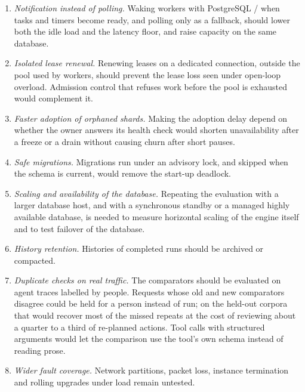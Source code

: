 \begin{enumerate}[leftmargin=*, itemsep=2pt]
  \item \emph{Notification instead of polling.} Waking workers with
    PostgreSQL / when tasks and timers become ready, and
    polling only as a fallback, should lower both the idle load and the
    latency floor, and raise capacity on the same database.
  \item \emph{Isolated lease renewal.} Renewing leases on a dedicated
    connection, outside the pool used by workers, should prevent the lease
    loss seen under open-loop overload. Admission control that refuses work
    before the pool is exhausted would complement it.
  \item \emph{Faster adoption of orphaned shards.} Making the adoption delay
    depend on whether the owner answers its health check would shorten
    unavailability after a freeze or a drain without causing churn after
    short pauses.
  \item \emph{Safe migrations.} Migrations run under an advisory lock, and
    skipped when the schema is current, would remove the start-up deadlock.
  \item \emph{Scaling and availability of the database.} Repeating the
    evaluation with a larger database host, and with a synchronous standby
    or a managed highly available database, is needed to measure horizontal
    scaling of the engine itself and to test failover of the database.
  \item \emph{History retention.} Histories of completed runs should be
    archived or compacted.
  \item \emph{Duplicate checks on real traffic.} The comparators should be
    evaluated on agent traces labelled by people. Requests whose old and new
    comparators disagree could be held for a person instead of run; on the
    held-out corpora that would recover most of the missed repeats at the
    cost of reviewing about a quarter to a third of re-planned actions.
    Tool calls with structured arguments would let the comparison use the
    tool's own schema instead of reading prose.
  \item \emph{Wider fault coverage.} Network partitions, packet loss,
    instance termination and rolling upgrades under load remain untested.
\end{enumerate}
